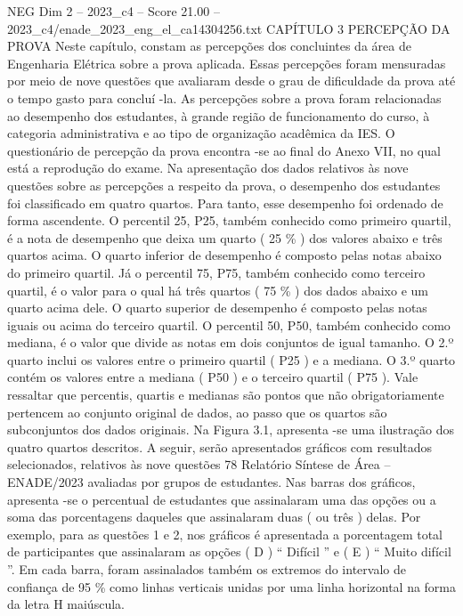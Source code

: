 \begin{textsample}{NEG Dim 2 – 2023\_c4 – Score 21.00 – 2023\_c4/enade\_2023\_eng\_el\_ca14304256.txt}  \label{ex:f2_neg_417}
CAPÍTULO 3 PERCEPÇÃO DA PROVA Neste capítulo, constam as percepções dos concluintes da área de Engenharia Elétrica sobre a prova aplicada.
Essas percepções foram mensuradas por meio de nove questões que avaliaram desde o grau de dificuldade da prova até o tempo gasto para concluí -la.
As percepções sobre a prova foram relacionadas ao desempenho dos estudantes, à grande região de funcionamento do curso, à categoria administrativa e ao tipo de organização acadêmica da IES.
O questionário de percepção da prova encontra -se ao final do Anexo VII, no qual está a reprodução do exame.
Na apresentação dos dados relativos às nove questões sobre as percepções a respeito da prova, o desempenho dos estudantes foi classificado em quatro quartos.
Para tanto, esse desempenho foi ordenado de forma ascendente.
O percentil 25, P25, também conhecido como primeiro quartil, é a nota de desempenho que deixa um quarto ( 25 \% ) dos valores abaixo e três quartos acima.
O quarto inferior de desempenho é composto pelas notas abaixo do primeiro quartil.
Já o percentil 75, P75, também conhecido como terceiro quartil, é o valor para o qual há três quartos ( 75 \% ) dos dados abaixo e um quarto acima dele.
O quarto superior de desempenho é composto pelas notas iguais ou acima do terceiro quartil.
O percentil 50, P50, também conhecido como mediana, é o valor que divide as notas em dois conjuntos de igual tamanho.
O 2.º quarto inclui os valores entre o primeiro quartil ( P25 ) e a mediana.
O 3.º quarto contém os valores entre a mediana ( P50 ) e o terceiro quartil ( P75 ).
Vale ressaltar que percentis, quartis e medianas são pontos que não obrigatoriamente pertencem ao conjunto original de dados, ao passo que os quartos são subconjuntos dos dados originais.
Na Figura 3.1, apresenta -se uma ilustração dos quatro quartos descritos.
A seguir, serão apresentados gráficos com resultados selecionados, relativos às nove questões 78 Relatório Síntese de Área – ENADE/2023 avaliadas por grupos de estudantes.
Nas barras dos gráficos, apresenta -se o percentual de estudantes que assinalaram uma das opções ou a soma das porcentagens daqueles que assinalaram duas ( ou três ) delas.
Por exemplo, para as questões 1 e 2, nos gráficos é apresentada a porcentagem total de participantes que assinalaram as opções ( D ) “ Difícil ” e ( E ) “ Muito difícil ”.
Em cada barra, foram assinalados também os extremos do intervalo de confiança de 95 \% como linhas verticais unidas por uma linha horizontal na forma da letra H maiúscula.

\end{textsample}
